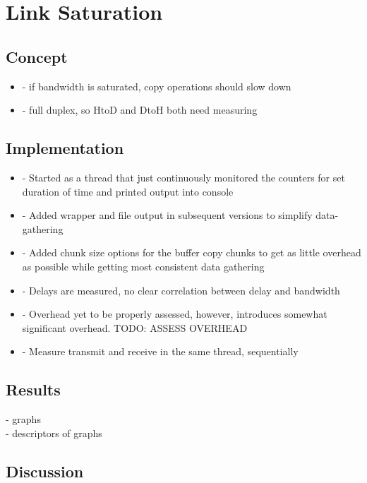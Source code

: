
\chapter{Link Saturation}\label{chapter:copy}

\section{Concept}
\begin{itemize}
	\item - if bandwidth is saturated, copy operations should slow down
	\item - full duplex, so HtoD and DtoH both need measuring
\end{itemize}

\section{Implementation}

\begin{itemize}
	\item - Started as a thread that just continuously monitored the counters for set duration of time and printed output into console
	\item - Added wrapper and file output in subsequent versions to simplify data-gathering
	\item - Added chunk size options for the buffer copy chunks to get as little overhead as possible while getting most consistent data gathering
	\item - Delays are measured, no clear correlation between delay and bandwidth
	\item - Overhead yet to be properly assessed, however, introduces somewhat significant overhead. TODO: ASSESS OVERHEAD
	\item - Measure transmit and receive in the same thread, sequentially
\end{itemize}


\section{Results}


- graphs\\
- descriptors of graphs

\section{Discussion}

